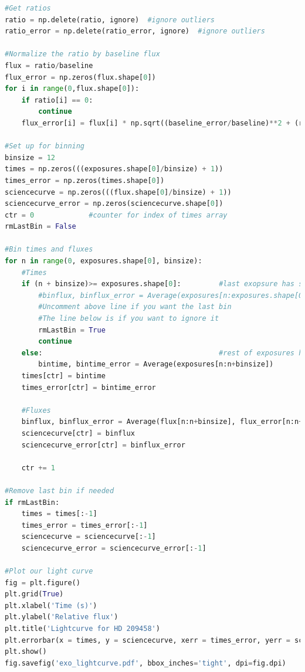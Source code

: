 \documentclass{aastex61}
\begin{document}
\begin{lstlisting}[language = Python, caption= Plots the lightcurve for our transit]
#Get ratios
ratio = np.delete(ratio, ignore)  #ignore outliers
ratio_error = np.delete(ratio_error, ignore)  #ignore outliers

#Normalize the ratio by baseline flux
flux = ratio/baseline
flux_error = np.zeros(flux.shape[0])
for i in range(0,flux.shape[0]):
	if ratio[i] == 0:
		continue
	flux_error[i] = flux[i] * np.sqrt((baseline_error/baseline)**2 + (ratio_error[i]/ratio[i])**2)

#Set up for binning
binsize = 12
times = np.zeros(((exposures.shape[0]/binsize) + 1))
times_error = np.zeros(times.shape[0])
sciencecurve = np.zeros(((flux.shape[0]/binsize) + 1))
sciencecurve_error = np.zeros(sciencecurve.shape[0])
ctr = 0             #counter for index of times array
rmLastBin = False

#Bin times and fluxes
for n in range(0, exposures.shape[0], binsize):
	#Times
	if (n + binsize)>= exposures.shape[0]:         #last exopsure has smaller bin size
		#binflux, binflux_error = Average(exposures[n:exposures.shape[0]])
		#Uncomment above line if you want the last bin
		#The line below is if you want to ignore it 
		rmLastBin = True
		continue
	else:                                          #rest of exposures have normal bin sizes
		bintime, bintime_error = Average(exposures[n:n+binsize])
	times[ctr] = bintime
	times_error[ctr] = bintime_error
	
	#Fluxes
	binflux, binflux_error = Average(flux[n:n+binsize], flux_error[n:n+binsize])
	sciencecurve[ctr] = binflux
	sciencecurve_error[ctr] = binflux_error
	
	ctr += 1

#Remove last bin if needed
if rmLastBin:
	times = times[:-1]
	times_error = times_error[:-1]
	sciencecurve = sciencecurve[:-1]
	sciencecurve_error = sciencecurve_error[:-1]

#Plot our light curve
fig = plt.figure()
plt.grid(True)
plt.xlabel('Time (s)')
plt.ylabel('Relative flux')
plt.title('Lightcurve for HD 209458')
plt.errorbar(x = times, y = sciencecurve, xerr = times_error, yerr = sciencecurve_error, fmt = 'k.')
plt.show()
fig.savefig('exo_lightcurve.pdf', bbox_inches='tight', dpi=fig.dpi)
\end{lstlisting}
\end{document}
